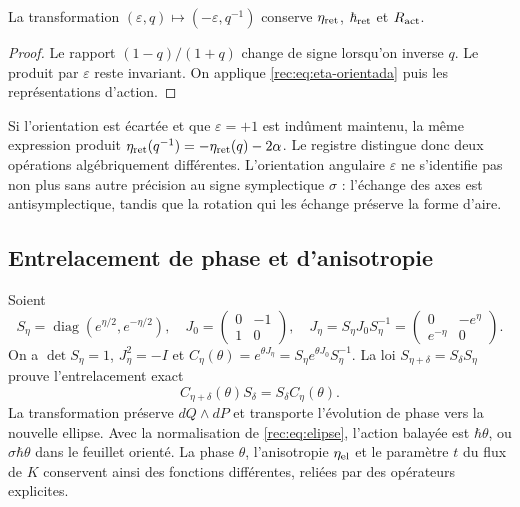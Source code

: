 \begin{corollary}
La transformation \((\varepsilon,q)\mapsto(-\varepsilon,q^{-1})\) conserve \(\eta_{\rm ret}\), \(\hbar_{\rm ret}\) et \(R_{\rm act}\).

\end{corollary}
\begin{proof}
Le rapport \((1-q)/(1+q)\) change de signe lorsqu’on inverse \(q\). Le produit par \(\varepsilon\) reste invariant. On applique \eqref{rec:eq:eta-orientada} puis les représentations d’action.
\end{proof}

Si l’orientation est écartée et que \(\varepsilon=+1\) est indûment maintenu, la même expression produit \(\eta_{\rm ret}(q^{-1})=-\eta_{\rm ret}(q)-2\alpha\). Le registre distingue donc deux opérations algébriquement différentes. L’orientation angulaire \(\varepsilon\) ne s’identifie pas non plus sans autre précision au signe symplectique \(\sigma\) : l’échange des axes est antisymplectique, tandis que la rotation qui les échange préserve la forme d’aire.


\subsection{Entrelacement de phase et d'anisotropie}

Soient
\[
 S_\eta=\operatorname{diag}(e^{\eta/2},e^{-\eta/2}),\quad
 J_0=\begin{pmatrix}0&-1\\1&0\end{pmatrix},\quad
 J_\eta=S_\eta J_0S_\eta^{-1}
       =\begin{pmatrix}0&-e^\eta\\e^{-\eta}&0\end{pmatrix}.
\]
On a \(\det S_\eta=1\), \(J_\eta^2=-I\) et \(C_\eta(\theta)=e^{\theta J_\eta}=S_\eta e^{\theta J_0}S_\eta^{-1}\). La loi \(S_{\eta+\delta}=S_\delta S_\eta\) prouve l'entrelacement exact
\begin{equation}
 C_{\eta+\delta}(\theta)S_\delta=S_\delta C_\eta(\theta).
 \label{rec:eq:entrelazamiento}
\end{equation}
La transformation préserve \(dQ\wedge dP\) et transporte l’évolution de phase vers la nouvelle ellipse. Avec la normalisation de \eqref{rec:eq:elipse}, l’action balayée est \(\hbar\theta\), ou \(\sigma\hbar\theta\) dans le feuillet orienté. La phase \(\theta\), l’anisotropie \(\eta_{\rm el}\) et le paramètre \(t\) du flux de \(K\) conservent ainsi des fonctions différentes, reliées par des opérateurs explicites.

